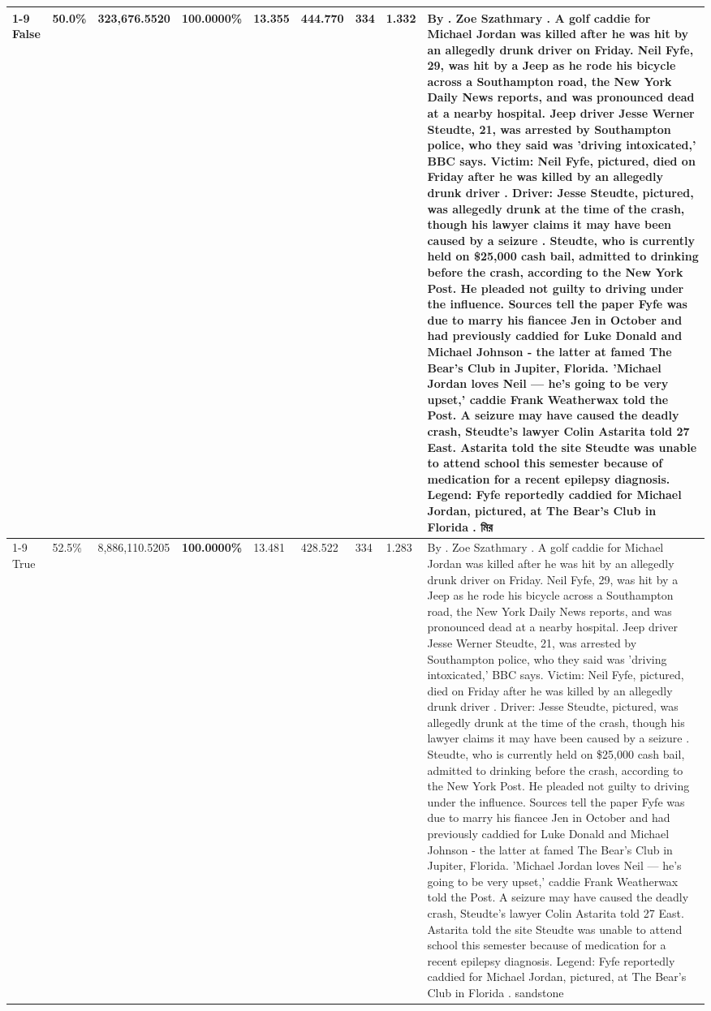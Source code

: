 \begin{table}[H]
\begin{tabular}{lllrlllll}
\cline{1-9}
False & 50.0\% & 323,676.5520 & \bfseries \color{red} 100.0000\% & 13.355 & 444.770 & 334 & 1.332 & By . Zoe Szathmary . A golf caddie for Michael Jordan was killed after he was hit by an allegedly drunk driver on Friday. Neil Fyfe, 29, was hit by a Jeep as he rode his bicycle across a Southampton road, the New York Daily News reports, and was pronounced dead at a nearby hospital. Jeep driver Jesse Werner Steudte, 21, was arrested by Southampton police, who they said was 'driving intoxicated,' BBC says. Victim: Neil Fyfe, pictured, died on Friday after he was killed by an allegedly drunk driver . Driver: Jesse Steudte, pictured, was allegedly drunk at the time of the crash, though his lawyer claims it may have been caused by a seizure . Steudte, who is currently held on \$25,000 cash bail, admitted to drinking before the crash, according to the New York Post. He pleaded not guilty to driving under the influence. Sources tell the paper Fyfe was due to marry his fiancee Jen in October and had previously caddied for Luke Donald and Michael Johnson - the latter at famed The Bear's Club in Jupiter, Florida. 'Michael Jordan loves Neil — he’s going to be very upset,' caddie Frank Weatherwax told the Post. A seizure may have caused the deadly crash, Steudte's lawyer Colin Astarita told 27 East. Astarita told the site Steudte was unable to attend school this semester because of medication for a recent epilepsy diagnosis. Legend: Fyfe reportedly caddied for Michael Jordan, pictured, at The Bear's Club in Florida . মির \\
\cline{1-9}
True & 52.5\% & 8,886,110.5205 & \bfseries \color{red} 100.0000\% & 13.481 & 428.522 & 334 & 1.283 & By . Zoe Szathmary . A golf caddie for Michael Jordan was killed after he was hit by an allegedly drunk driver on Friday. Neil Fyfe, 29, was hit by a Jeep as he rode his bicycle across a Southampton road, the New York Daily News reports, and was pronounced dead at a nearby hospital. Jeep driver Jesse Werner Steudte, 21, was arrested by Southampton police, who they said was 'driving intoxicated,' BBC says. Victim: Neil Fyfe, pictured, died on Friday after he was killed by an allegedly drunk driver . Driver: Jesse Steudte, pictured, was allegedly drunk at the time of the crash, though his lawyer claims it may have been caused by a seizure . Steudte, who is currently held on \$25,000 cash bail, admitted to drinking before the crash, according to the New York Post. He pleaded not guilty to driving under the influence. Sources tell the paper Fyfe was due to marry his fiancee Jen in October and had previously caddied for Luke Donald and Michael Johnson - the latter at famed The Bear's Club in Jupiter, Florida. 'Michael Jordan loves Neil — he’s going to be very upset,' caddie Frank Weatherwax told the Post. A seizure may have caused the deadly crash, Steudte's lawyer Colin Astarita told 27 East. Astarita told the site Steudte was unable to attend school this semester because of medication for a recent epilepsy diagnosis. Legend: Fyfe reportedly caddied for Michael Jordan, pictured, at The Bear's Club in Florida . sandstone \\

\end{tabular}
\end{table}
